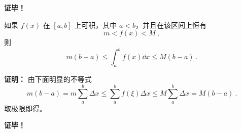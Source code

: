 \textbf{证毕！}

\begin{theorem}{}\label{the_DIntP_3}
如果 $f(x)$ 在 $[a,b]$ 上可积，其中 $a<b$，并且在该区间上恒有
\begin{equation}
m<f(x)<M~,
\end{equation}
则
\begin{equation}
m(b-a)\leq\int_a^b f(x)\dd x\leq M(b-a)~.
\end{equation}
\end{theorem}
\textbf{证明：}
由下面明显的不等式
\begin{equation}
m(b-a)=m\sum_a^b\Delta x\leq\sum_a^b f(\xi)\Delta x\leq M\sum_a^b\Delta x=M(b-a)~.
\end{equation}
取极限即得。

\textbf{证毕！}
